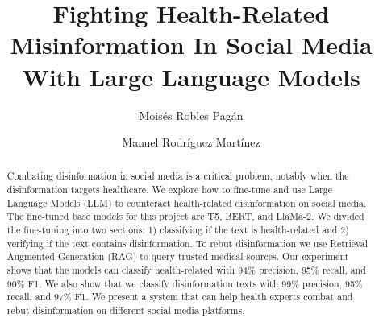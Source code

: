 \documentclass{svproc}
\begin{document}
\mainmatter              %
%
\title{Fighting Health-Related Misinformation In Social Media With Large Language Models}
%
%
\author{Mois\'es Robles Pag\'an \and Manuel Rodr\'iguez Mart\'inez}
%
%
%

\maketitle              %


\begin{abstract}
Combating disinformation in social media is a critical problem, notably when the disinformation targets healthcare. We explore how to fine-tune and use Large Language Models (LLM) to counteract health-related disinformation on social media. The fine-tuned base models for this project are T5, BERT, and LlaMa-2. We divided the fine-tuning into two sections: 1) classifying if the text is health-related and 2) verifying if the text contains disinformation. To rebut disinformation we use Retrieval Augmented Generation (RAG) to query trusted medical sources. Our experiment shows that the models can classify health-related with 94\% precision, 95\% recall, and 90\% F1. We also show that we classify disinformation texts with 99\% precision, 95\% recall, and 97\% F1. We present a system that can help health experts combat and rebut disinformation on different social media platforms.
\end{abstract}











%
%

\end{document}
